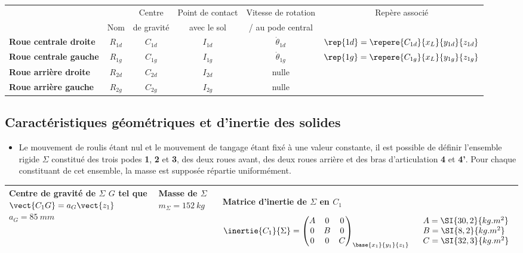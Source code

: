 \begin{tabular}{lccccc}
\hline
&                & Centre          & Point de contact& Vitesse de rotation &  Repère associé \\
&    Nom     & de gravité    & avec le sol &  / au pode central & \\
\hline
\textbf{Roue centrale droite} & $R_{1d}$ & $C_{1d}$ & $I_{1d}$ & $\dot{\theta}_{1d}$ & $\rep{1d}=\repere{C_{1d}}{x_L}{y_{1d}}{z_{1d}}$ \\ 
\textbf{Roue centrale gauche} & $R_{1g}$ & $C_{1g}$ & $I_{1g}$ & $\dot{\theta}_{1g}$ & $\rep{1g}=\repere{C_{1g}}{x_L}{y_{1g}}{z_{1g}}$ \\ 
\textbf{Roue arrière droite} & $R_{2d}$ & $C_{2d}$ & $I_{2d}$ & nulle &  \\ 
\textbf{Roue arrière gauche} & $R_{2g}$ & $C_{2g}$ & $I_{2g}$ & nulle &\\ \hline
\end{tabular}

\fi

\subsection*{Caractéristiques géométriques et d’inertie des solides}
\ifprof
\else

\begin{itemize}
\item Le mouvement de roulis étant nul et le mouvement de tangage étant fixé à une valeur constante, il est possible de définir l’ensemble rigide $\Sigma$ constitué des trois podes \textbf{1}, \textbf{2} et \textbf{3}, des deux roues avant, des deux roues arrière et des bras d’articulation \textbf{4} et \textbf{4’}. Pour chaque constituant de cet ensemble, la masse est supposée répartie uniformément.
\end{itemize}

\begin{center}
\begin{tabular}{|p{4cm}|p{4cm}|p{8cm}|}
\hline
Centre de gravité de $\Sigma$ 
$G$ tel que $\vect{C_1G}=a_G\vect{z_1}$
$a_G =\SI{85}{mm}$
& 
Masse de $\Sigma$ $m_{\Sigma}=\SI{152}{kg}$
& 
Matrice d'inertie de $\Sigma$ en $C_1$ 

$\inertie{C_1}{\Sigma}=
\begin{pmatrix} 
A & 0 & 0 \\ 0 & B & 0 \\ 0 & 0 & C 
\end{pmatrix}_{\base{x_1}{y_1}{z_1}}
\quad 
\begin{array}{l}
A =\SI{30,2}{kg.m^2} \\
B =\SI{8,2}{kg.m^2} \\
C =\SI{32,3}{kg.m^2} \\
\end{array}$ \\
\hline
\end{tabular}
\end{center}



